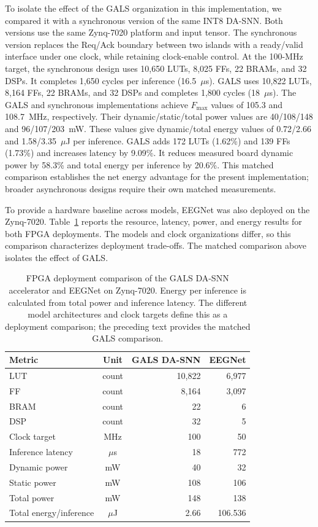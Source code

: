 \documentclass[12pt]{article}
\begin{document}
To isolate the effect of the GALS organization in this implementation, we compared it with a synchronous version of the same INT8 DA-SNN. Both versions use the same Zynq-7020 platform and input tensor. The synchronous version replaces the Req/Ack boundary between two islands with a ready/valid interface under one clock, while retaining clock-enable control. At the 100-MHz target, the synchronous design uses 10,650 LUTs, 8,025 FFs, 22 BRAMs, and 32 DSPs. It completes 1,650 cycles per inference (16.5~$\mu$s). GALS uses 10,822 LUTs, 8,164 FFs, 22 BRAMs, and 32 DSPs and completes 1,800 cycles (18~$\mu$s). The GALS and synchronous implementations achieve $F_{\max}$ values of 105.3 and 108.7~MHz, respectively. Their dynamic/static/total power values are 40/108/148 and 96/107/203~mW. These values give dynamic/total energy values of 0.72/2.66 and 1.58/3.35~$\mu$J per inference. GALS adds 172 LUTs (1.62\%) and 139 FFs (1.73\%) and increases latency by 9.09\%. It reduces measured board dynamic power by 58.3\% and total energy per inference by 20.6\%. This matched comparison establishes the net energy advantage for the present implementation; broader asynchronous designs require their own matched measurements.

To provide a hardware baseline across models, EEGNet was also deployed on the Zynq-7020. Table~\ref{tab:fpga_eegnet_comparison} reports the resource, latency, power, and energy results for both FPGA deployments. The models and clock organizations differ, so this comparison characterizes deployment trade-offs. The matched comparison above isolates the effect of GALS.

\begin{table}[!htbp]
\centering
\caption{FPGA deployment comparison of the GALS DA-SNN accelerator and EEGNet on Zynq-7020. Energy per inference is calculated from total power and inference latency. The different model architectures and clock targets define this as a deployment comparison; the preceding text provides the matched GALS comparison.}
\label{tab:fpga_eegnet_comparison}
\scriptsize
\renewcommand{\arraystretch}{1.14}
\setlength{\tabcolsep}{4pt}
\begin{tabular}{@{}lcrr@{}}
\toprule
Metric & Unit & GALS DA-SNN & EEGNet \\
\midrule
LUT & count & 10,822 & 6,977 \\
FF & count & 8,164 & 3,097 \\
BRAM & count & 22 & 6 \\
DSP & count & 32 & 5 \\
Clock target & MHz & 100 & 50 \\
Inference latency & $\mu$s & 18 & 772 \\
Dynamic power & mW & 40 & 32 \\
Static power & mW & 108 & 106 \\
Total power & mW & 148 & 138 \\
Total energy/inference & $\mu$J & 2.66 & 106.536 \\
\bottomrule
\end{tabular}
\end{table}
\end{document}

